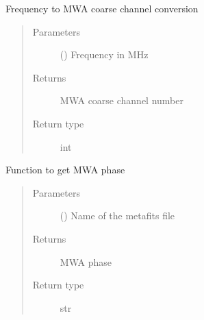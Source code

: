 \documentclass[letterpaper,10pt,english]{sphinxmanual}
\begin{document}

\begin{fulllineitems}
\label{\detokenize{paircars:paircars.basic_func.freq_to_MWA_coarse}}
\sphinxAtStartPar
Frequency to MWA coarse channel conversion
\begin{quote}\begin{description}
\item[{Parameters}] \leavevmode
\sphinxAtStartPar
{} () \textendash{} Frequency in MHz

\item[{Returns}] \leavevmode
\sphinxAtStartPar
MWA coarse channel number

\item[{Return type}] \leavevmode
\sphinxAtStartPar
int

\end{description}\end{quote}

\end{fulllineitems}


\begin{fulllineitems}
\label{\detokenize{paircars:paircars.basic_func.get_MWA_phase}}
\sphinxAtStartPar
Function to get MWA phase
\begin{quote}\begin{description}
\item[{Parameters}] \leavevmode
\sphinxAtStartPar
{} () \textendash{} Name of the metafits file

\item[{Returns}] \leavevmode
\sphinxAtStartPar
MWA phase

\item[{Return type}] \leavevmode
\sphinxAtStartPar
str

\end{description}\end{quote}

\end{fulllineitems}
\end{document}
